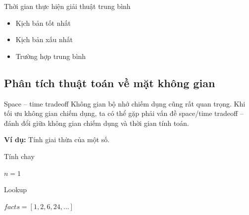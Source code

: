\documentclass[]{beamer}
\newenvironment{ffr}
               {\begin{frame}{\subsecname}}
               {\end{frame}}
\begin{document}
\begin{ffr}
\begin{ffr}
  Thời gian thực hiện giải thuật trung bình
  \begin{itemize}
  \item Kịch bản tốt nhất
  \item Kịch bản xấu nhất
  \item Trường hợp trung bình
  \end{itemize}
\end{ffr}

\subsection{Phân tích thuật toán về mặt không gian}
\begin{ffr}
  \begin{block}{Space -- time tradeoff}
    Không gian bộ nhớ chiếm dụng cũng rất quan trọng. Khi tối ưu không gian chiếm dụng, ta có thể gặp phải vấn đề space/time tradeoff -- đánh đổi giữa không gian chiếm dụng và thời gian tính toán. 
  \end{block}
  \textbf{Ví dụ:} Tính giai thừa của một số.\vspace{-1em}
  \begin{minipage}[t]{0.4\pagewidth}
    \begin{algorithm}[H]
      \caption{Tính chay}
      \begin{algorithmic}[1]
        \State $n = 1$
        \EndFor
        \EndProcedure
      \end{algorithmic}
    \end{algorithm}
  \end{minipage}
  \begin{minipage}[t]{0.4\pagewidth}
    \begin{algorithm}[H]
      \caption{Lookup}
      \begin{algorithmic}[1]
        \State $facts = [1, 2, 6, 24,\ldots] $
        \EndProcedure
      \end{algorithmic}
    \end{algorithm}
  \end{minipage}
\end{ffr}


\end{ffr}
\end{document}
